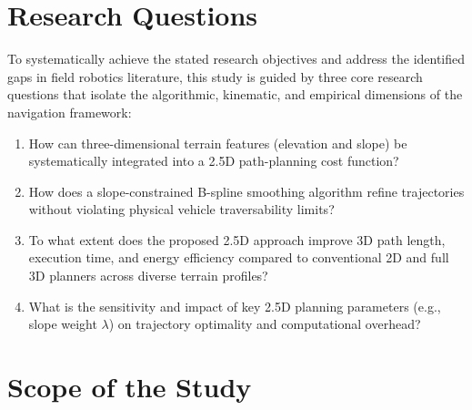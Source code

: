 \section{Research Questions}

To systematically achieve the stated research objectives and address the
identified gaps in field robotics literature, this study is guided by three core
research questions that isolate the algorithmic, kinematic, and empirical
dimensions of the navigation framework:

\begin{enumerate}
    \item How can three-dimensional terrain features (elevation and slope) be systematically integrated into a 2.5D path-planning cost function?

\item How does a slope-constrained B-spline smoothing algorithm refine
    trajectories without violating physical vehicle traversability limits?

    \item To what extent does the proposed 2.5D approach improve 3D path length, execution time, and energy efficiency compared to conventional 2D and full 3D planners across diverse terrain profiles?
    \item What is the sensitivity and impact of key 2.5D planning parameters (e.g., slope weight $\lambda$) on trajectory optimality and computational overhead?
\end{enumerate}

\section{Scope of the Study}

